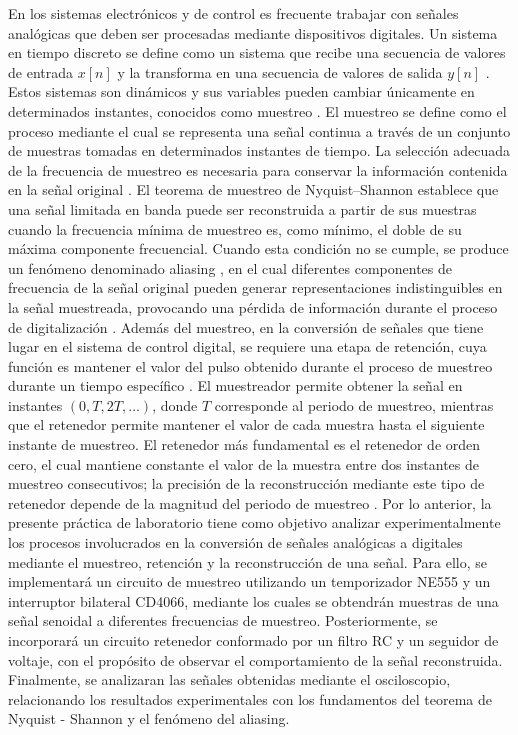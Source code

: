 \documentclass[conference]{IEEEtran}
\begin{document}
En los sistemas electrónicos y de control es frecuente trabajar con señales analógicas que deben ser procesadas mediante dispositivos digitales. Un sistema en tiempo discreto se define como un sistema que recibe una secuencia de valores de entrada $x[n]$ y la transforma en una secuencia de valores de salida $y[n]$ \cite{oppenheim}. Estos sistemas son dinámicos y sus variables pueden cambiar únicamente en determinados instantes, conocidos como muestreo \cite{cuero}. El muestreo se define como el proceso mediante el cual se representa una señal continua a través de un conjunto de muestras tomadas en determinados instantes de tiempo. La selección adecuada de la frecuencia de muestreo es necesaria para conservar la información contenida en la señal original \cite{ogata}.
El teorema de muestreo de Nyquist--Shannon establece que una señal limitada en banda puede ser reconstruida a partir de sus muestras cuando la frecuencia mínima de muestreo es, como mínimo, el doble de su máxima componente frecuencial. Cuando esta condición no se cumple, se produce un fenómeno denominado aliasing \cite{semeria}, en el cual diferentes componentes de frecuencia de la señal original pueden generar representaciones indistinguibles en la señal muestreada, provocando una pérdida de información durante el proceso de digitalización \cite{osorio}.
Además del muestreo, en la conversión de señales que tiene lugar en el sistema de control digital, se requiere una etapa de retención, cuya función es mantener el valor del pulso obtenido durante el proceso de muestreo durante un tiempo específico \cite{ogata}. El muestreador permite obtener la señal en instantes $(0, T, 2T, \ldots)$, donde $T$ corresponde al periodo de muestreo, mientras que el retenedor permite mantener el valor de cada muestra hasta el siguiente instante de muestreo. El retenedor más fundamental es el retenedor de orden cero, el cual mantiene constante el valor de la muestra entre dos instantes de muestreo consecutivos; la precisión de la reconstrucción mediante este tipo de retenedor depende de la magnitud del periodo de muestreo \cite{cuero}.
Por lo anterior, la presente práctica de laboratorio tiene como objetivo analizar experimentalmente los procesos involucrados en la conversión de señales analógicas a digitales mediante el muestreo, retención y la reconstrucción de una señal. Para ello, se implementará un circuito de muestreo utilizando un temporizador NE555 y un interruptor bilateral CD4066, mediante los cuales se obtendrán muestras de una señal senoidal a diferentes frecuencias de muestreo. Posteriormente, se incorporará un circuito retenedor conformado por un filtro RC y un seguidor de voltaje, con el propósito de observar el comportamiento de la señal reconstruida. Finalmente, se analizaran las señales obtenidas mediante el osciloscopio, relacionando los resultados experimentales con los fundamentos del teorema de Nyquist - Shannon y el fenómeno del aliasing.
\end{document}
